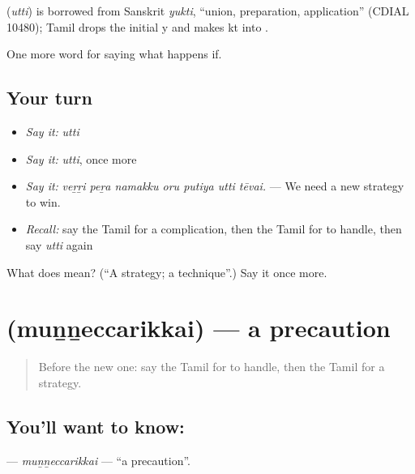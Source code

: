 \begin{cousinweb}
\textbf{} (\emph{utti}) is borrowed from Sanskrit \emph{yukti}, \textquotedblleft{}union, preparation, application\textquotedblright{} (CDIAL 10480); Tamil drops the initial y and makes kt into .
\end{cousinweb}

\begin{grammarlens}[title={What you've built}]
One more word for saying what happens if.
\end{grammarlens}

\subsection*{Your turn}
\begin{itemize}
\raggedright
  \item \emph{Say it:} \emph{utti}
  \item \emph{Say it:} \emph{utti}, once more
  \item \emph{Say it:} \emph{veṟṟi peṟa namakku oru putiya utti tēvai.} — We need a new strategy to win.
  \item \emph{Recall:} say the Tamil for a complication, then the Tamil for to handle, then say \emph{utti} again
\end{itemize}

\begin{tcolorbox}[breakable,colback=teal!4,colframe=teal!35!black,title={Before you move on}]
What does  mean? (\textquotedblleft{}A strategy; a technique\textquotedblright{}.) Say it once more.
\end{tcolorbox}
\section[\texorpdfstring{\ta{முன்னெச்சரிக்கை} (muṉṉeccarikkai)}{முன்னெச்சரிக்கை (muṉṉeccarikkai)}]{ (muṉṉeccarikkai) — a precaution}

\label{lesson:TA-C386-munneccarikkai}



\begin{quote}
Before the new one: say the Tamil for to handle, then the Tamil for a strategy.
\end{quote}

\subsection*{You'll want to know: }
\textbf{} — \emph{muṉṉeccarikkai} — \textquotedblleft{}a precaution\textquotedblright{}.

